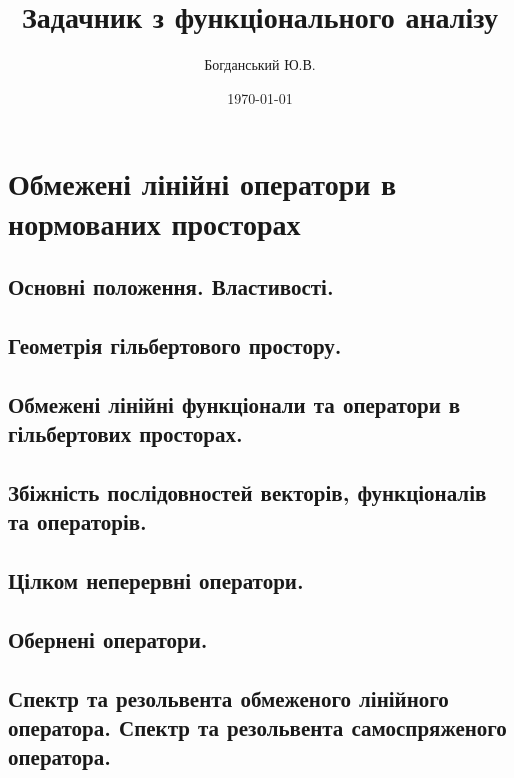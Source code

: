 \documentclass{extreport}
\author{Богданський Ю.В.}
\title{Задачник з функціонального аналізу}
\date{\today}
\begin{document}
    \maketitle
    \tableofcontents
    \chapter{Обмежені лінійні оператори в нормованих просторах}
        \section{Основні положення. Властивості.}
            
            
            
        \section{Геометрія гільбертового простору.}
            
            
            
            
        \section{Обмежені лінійні функціонали та оператори в гільбертових просторах.}
            
            
            
            
        \section{Збіжність послідовностей векторів, функціоналів та операторів.}
            
            
            
        \section{Цілком неперервні оператори.}
            
            
            
              
        \section{Обернені оператори.}
            
            
            
        \section{Спектр та резольвента обмеженого лінійного оператора. 
                 Спектр та резольвента самоспряженого оператора.}
            
            
            
\end{document}
